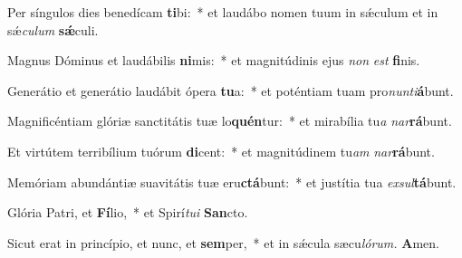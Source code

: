 \item Per síngulos dies benedícam \textbf{ti}bi:~* et laudábo nomen tuum in sǽculum et in sǽ\tinyhspace\textit{culum} \textbf{sǽ}culi.
\item Magnus Dóminus et laudábilis \textbf{ni}mis:~* et magnitúdinis ejus \textit{non} \textit{est} \textbf{fi}nis.
\item Generátio et generátio laudábit ópera \textbf{tu}a:~* et poténtiam tuam pro\textit{nunti}\textbf{á}bunt.
\item Magnificéntiam glóriæ sanctitátis tuæ lo\textbf{quén}tur:~* et mirabília tu\tinyhspace\textit{a} \textit{nar}\textbf{rá}bunt.
\item Et virtútem terribílium tuórum \textbf{di}cent:~* et magnitúdinem tu\tinyhspace\textit{am} \textit{nar}\textbf{rá}bunt.
\item Memóriam abundántiæ suavitátis tuæ eru\textbf{ctá}bunt:~* et justítia tua \textit{exsul}\textbf{tá}bunt.
\item Glória Patri, et \textbf{Fí}lio,~* et Spirí\tinyhspace\textit{tui} \textbf{San}cto.
\item Sicut erat in princípio, et nunc, et \textbf{sem}per,~* et in sǽcula sæcu\tinyhspace\textit{lórum.} \textbf{A}men.